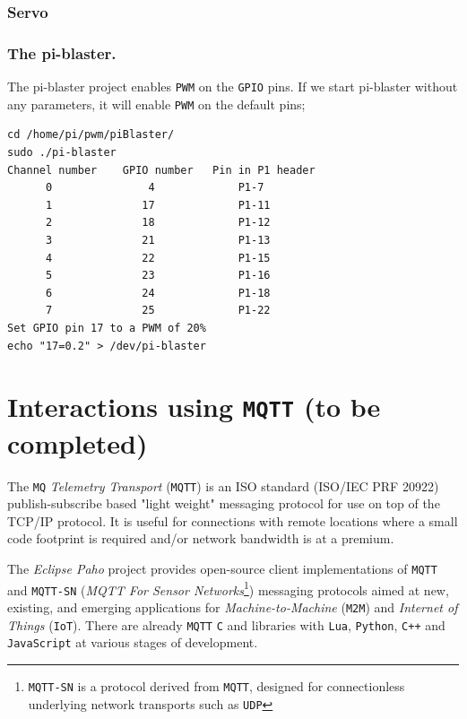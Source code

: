 \subsubsection{Servo}

\subsubsection{The pi-blaster.}
The pi-blaster project enables \texttt{PWM} on the \texttt{GPIO} pins. If we start pi-blaster without any parameters, it will enable \texttt{PWM} on the default pins;
\begin{verbatim}
cd /home/pi/pwm/piBlaster/
sudo ./pi-blaster
Channel number    GPIO number   Pin in P1 header
      0               4             P1-7
      1              17             P1-11
      2              18             P1-12
      3              21             P1-13
      4              22             P1-15
      5              23             P1-16
      6              24             P1-18
      7              25             P1-22
Set GPIO pin 17 to a PWM of 20%
echo "17=0.2" > /dev/pi-blaster
\end{verbatim}      

 





 

\newpage  
	\section{Interactions using \texttt{MQTT} (to be completed)}
 
The \texttt{MQ} \textit{Telemetry Transport} (\texttt{MQTT}) is an ISO standard (ISO/IEC PRF 20922) publish-subscribe based "light weight" messaging protocol for use on top of the TCP/IP protocol. It is useful for connections with remote locations where a small code footprint is required and/or network bandwidth is at a premium.

The \textit{Eclipse Paho} project provides open-source client implementations of \texttt{MQTT} and \texttt{MQTT-SN} (\textit{MQTT For Sensor Networks}\footnote{\texttt{MQTT-SN} is a protocol derived from \texttt{MQTT}, designed for connectionless underlying network transports such as \texttt{UDP}}) messaging protocols aimed at new, existing, and emerging applications for \textit{Machine-to-Machine} (\texttt{M2M}) and \textit{Internet of Things} (\texttt{IoT}). There are already \texttt{MQTT} \texttt{C} and \java{} libraries with \texttt{Lua}, \texttt{Python}, \texttt{C++} and \texttt{JavaScript} at various stages of development.


